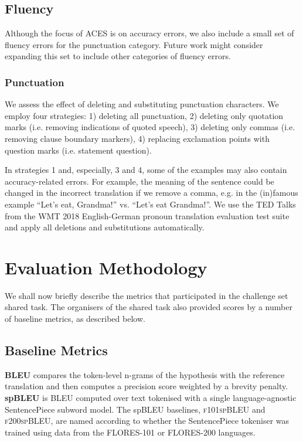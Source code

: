 \documentclass[11pt]{article}
\begin{document}
\subsection{Fluency}
Although the focus of \textsc{ACES} is on accuracy errors, we also include a small set of fluency errors for the punctuation category. Future work might consider expanding this set to include other categories of fluency errors. 

\subsubsection{Punctuation}
\label{sec:punctuation}
We assess the effect of deleting and substituting punctuation characters. We employ four strategies: 1) deleting all punctuation, 2) deleting only quotation marks (i.e. removing indications of quoted speech), 3) deleting only commas (i.e. removing clause boundary markers), 4) replacing exclamation points with question marks (i.e. statement  question).

In strategies 1 and, especially, 3 and 4, some of the examples may also contain accuracy-related errors. For example, the meaning of the sentence could be changed in the incorrect translation if we remove a comma, e.g. in the (in)famous example ``Let's eat, Grandma!'' vs. ``Let's eat Grandma!''. We use the TED Talks from the WMT 2018 English-German pronoun translation evaluation test suite and apply all deletions and substitutions automatically.

\section{Evaluation Methodology}
\label{sec:eval_methodology}

We shall now briefly describe the metrics that participated in the challenge set shared task. The organisers of the shared task also provided scores by a number of baseline metrics, as described below.

\subsection{Baseline Metrics}
\textbf{BLEU} \citep{papineni-etal-2002-bleu} compares the token-level n-grams of the hypothesis with the reference translation and then computes a precision score weighted by a brevity penalty.\\

\noindent\textbf{spBLEU} \citep{goyal-etal-2022-flores} is BLEU computed over text tokenised with a single language-agnostic SentencePiece subword model. The spBLEU baselines, \textsc{f101spBLEU} and \textsc{f200spBLEU}, are named according to whether the SentencePiece tokeniser \citep{kudo-richardson-2018-sentencepiece} was trained using data from the FLORES-101 or FLORES-200 languages.\\
\end{document}

